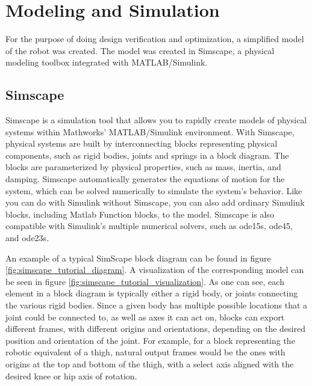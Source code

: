\section{Modeling and Simulation}
\label{sec:modeling_and_simulation}
For the purpose of doing design verification and optimization, a simplified model of the robot was created. The model was created in Simscape, a physical modeling toolbox integrated with MATLAB/Simulink. 

\subsection{Simscape}

Simscape \cite{simulink_simscape} is a simulation tool that allows you to rapidly create models of physical systems within Mathworks' MATLAB/Simulink environment. With Simscape, physical systems are built by interconnecting blocks representing physical components, such as rigid bodies, joints and springs in a block diagram. The blocks are parameterized by physical properties, such as mass, inertia, and damping. Simscape automatically generates the equations of motion for the system, which can be solved numerically to simulate the system's behavior. Like you can do with Simulink without Simscape, you can also add ordinary Simulink blocks, including Matlab Function blocks, to the model. Simscape is also compatible with Simulink's multiple numerical solvers, such as ode15s, ode45, and ode23s. 

An example of a typical SimScape block diagram can be found in figure \ref{fig:simscape_tutorial_diagram}. A visualization of the corresponding model can be seen in figure \ref{fig:simscape_tutorial_visualization}. As one can see, each element in a block diagram is typically either a rigid body, or joints connecting the various rigid bodies. Since a given body has multiple possible locations that a joint could be connected to, as well as axes it can act on, blocks can export different frames, with different origins and orientations, depending on the desired position and orientation of the joint. For example, for a block representing the robotic equivalent of a thigh, natural output frames would be the ones with origins at the top and bottom of the thigh, with a select axis aligned with the desired knee or hip axis of rotation. 

